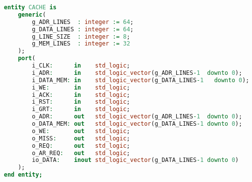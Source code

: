 \documentclass[../main.tex]{subfiles}
\begin{document}
\begin{lstlisting}[language=VHDL, caption={Entitatea memoriei cache}, label={lst:cache}]
entity CACHE is
	generic(
		g_ADR_LINES  : integer := 64;
		g_DATA_LINES : integer := 64;
		g_LINE_SIZE  : integer := 8;
		g_MEM_LINES  : integer := 32
	);
	port(
		i_CLK:      in    std_logic;
		i_ADR:      in    std_logic_vector(g_ADR_LINES-1  downto 0);
		i_DATA_MEM: in    std_logic_vector(g_DATA_LINES-1	downto 0);
		i_WE:       in    std_logic;
		i_ACK:      in    std_logic;
		i_RST:      in    std_logic;
		i_GRT:      in    std_logic;
		o_ADR:      out   std_logic_vector(g_ADR_LINES-1  downto 0); 
		o_DATA_MEM: out   std_logic_vector(g_DATA_LINES-1 downto 0);
		o_WE:       out   std_logic;
		o_MISS:     out   std_logic;
		o_REQ:      out	  std_logic;
		o_AR_REQ:   out   std_logic;
		io_DATA:    inout std_logic_vector(g_DATA_LINES-1 downto 0)
	);
end entity;
\end{lstlisting}
\end{document}
